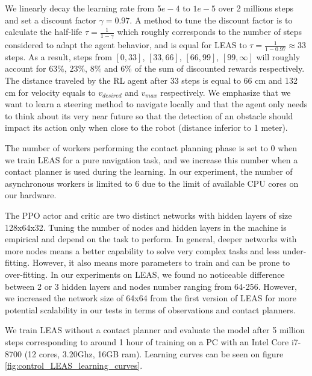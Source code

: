 We linearly decay the learning rate from $5e-4$ to $1e-5$ over 2 millions steps and set a discount factor $\gamma = 0.97$. 
A method to tune the discount factor is to calculate the half-life $\tau = \frac{1}{1-\gamma}$ which roughly corresponds to the number of steps considered to adapt the agent behavior, and is equal for LEAS to $\tau = \frac{1}{1-0.97} \approx 33$ steps. 
As a result, steps from $[0,33]$, $[33,66]$, $[66,99]$, $[99,\infty]$ will roughly account for $63\%$, $23\%$, $8\%$ and $6\%$ of the sum of discounted rewards respectively. 
The distance traveled by the RL agent after 33 steps is equal to 66 cm and 132 cm for velocity equals to $v_{desired}$ and $v_{max}$ respectively.
We emphasize that we want to learn a steering method to navigate locally and that the agent only needs to think about its very near future so that the detection of an obstacle should impact its action only when close to the robot (distance inferior to 1 meter).

The number of workers performing the contact planning phase is set to 0 when we train LEAS for a pure navigation task, and we increase this number when a contact planner is used during the learning. In our experiment, the number of asynchronous workers is limited to 6 due to the limit of available CPU cores on our hardware.

The PPO actor and critic are two distinct networks with hidden layers of size 128x64x32. Tuning the number of nodes and hidden layers in the machine is empirical and depend on the task to perform. In general, deeper networks with more nodes means a better capability to solve very complex tasks and less under-fitting. However, it also means more parameters to train and can be prone to over-fitting. In our experiments on LEAS, we found no noticeable difference between 2 or 3 hidden layers and nodes number ranging from 64-256. However, we increased the network size of 64x64 from the first version of LEAS \cite{LEAS} for more potential scalability in our tests in terms of observations and contact planners.

We train LEAS without a contact planner and evaluate the model after 5 million steps corresponding to around 1 hour of training on a PC with an Intel Core i7-8700 (12 cores, 3.20Ghz, 16GB ram). Learning curves can be seen on figure \ref{fig:control_LEAS_learning_curves}.

